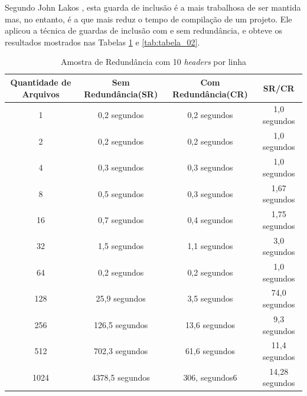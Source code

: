 \begin{enumerate}
Segundo John Lakos \cite[pág. 82]{ref42}, esta guarda de inclusão é a mais trabalhosa de ser mantida
 mas, no entanto, é a que mais reduz o tempo de compilação de um projeto. Ele
 aplicou a técnica de guardas de inclusão com e sem redundância,
 e obteve os resultados mostrados nas Tabelas \ref{tab:tabela_01} e 
\ref{tab:tabela_02}.

\begin{table}[!ht]
    \centering
    \caption {Amostra de Redundância com 10 \textit{headers} por linha}
    \label{tab:tabela_01}
    \begin{tiny}
    \begin{tabular}{cccc}
    \toprule
    \textbf{Quantidade de Arquivos} & \textbf{Sem Redundância(SR)} & \textbf{Com Redundância(CR)} &  \textbf{SR/CR} \\
    \midrule
    1 		& 0,2 	 segundos	 & 0,2 	 segundos		& 1,0	 segundos   \\
    2 		& 0,2 	 segundos	 & 0,2 	 segundos		& 1,0	 segundos   \\
    4 		& 0,3 	 segundos	 & 0,3 	 segundos		& 1,0	 segundos   \\
    8 		& 0,5	 segundos	 & 0,3 	 segundos		& 1,67	 segundos   \\
    16 		& 0,7 	 segundos	 & 0,4 	 segundos		& 1,75	 segundos   \\
    32 		& 1,5 	 segundos	 & 1,1 	 segundos		& 3,0	 segundos   \\
    64 		& 0,2 	 segundos	 & 0,2 	 segundos		& 1,0	 segundos   \\
    128		& 25,9	 segundos	 & 3,5 	 segundos		& 74,0	 segundos   \\
    256		& 126,5	 segundos	 & 13,6  segundos		& 9,3	 segundos   \\
    512 	& 702,3	 segundos	 & 61,6  segundos		& 11,4	 segundos   \\
    1024	& 4378,5 segundos     & 306, segundos6 		& 14,28	 segundos   \\
    \bottomrule
    \end{tabular}
    \end{tiny}
\end{table}


\end{enumerate}
